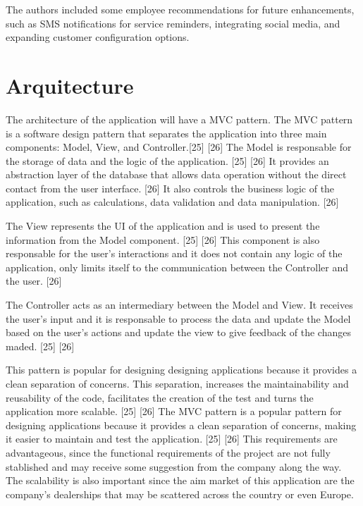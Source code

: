 The authors included some employee recommendations for future enhancements, such as SMS notifications for service reminders, integrating social media, and expanding customer configuration options.


\section{Arquitecture}

The architecture of the application will have a \ac{MVC} pattern. 
The \ac{MVC} pattern is a software design pattern that separates the application into three main components: Model, View, and Controller.[25] [26]
The Model is responsable for the storage of data and the logic of the application.  [25] [26]
It provides an abstraction layer of the database that allows data operation without the direct contact from the user interface. [26]
It also controls the business logic of the application, such as calculations, data validation and data manipulation. [26]

The View represents the \ac{UI} of the application and is used to present the information from the Model component. [25] [26]
This component is also responsable for the user's interactions and it does not contain any logic of the application, only limits itself to the communication between the Controller and the user. [26]

The Controller acts as an intermediary between the Model and View.
It receives the user's input and it is responsable to process the data and update the Model based on the user's actions and update the view to give feedback of the changes maded. [25] [26]

This pattern is popular for designing designing applications because it provides a clean separation of concerns. This separation, increases the maintainability and reusability of the code, facilitates the creation of the test and turns the application more scalable. [25] [26]
The \ac{MVC} pattern is a popular pattern for designing applications because it provides a clean separation of concerns, making it easier to maintain and test the application. [25] [26]
This requirements are advantageous, since the functional requirements of the project are not fully stablished and may receive some suggestion from the company along the way. 
The scalability is also important since the aim market of this application are the company's dealerships that may be scattered across the country or even Europe.

